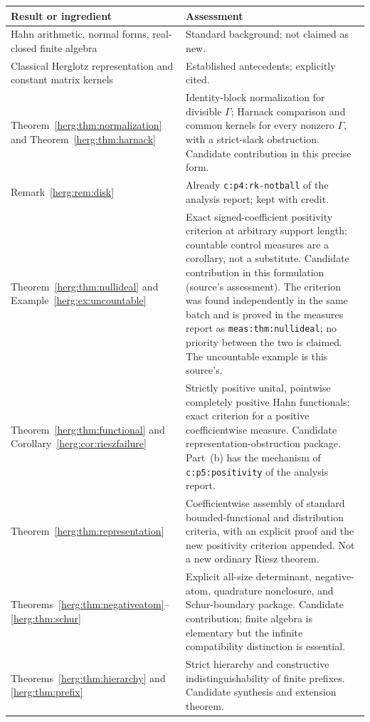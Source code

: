 \documentclass[11pt,letterpaper]{article}
\theoremstyle{definition}
\newcommand{\lbl}[1]{\nolinkurl{#1}}%
\numberwithin{equation}{section}
\begin{document}
\begin{longtable}{@{}p{}p{}@{}}
\toprule
Result or ingredient & Assessment\\
\midrule
\endhead
Hahn arithmetic, normal forms, real-closed finite algebra & Standard background; not claimed as new.\\[4pt]
Classical Herglotz representation and constant matrix kernels & Established antecedents; explicitly cited.\\[4pt]
Theorem~\ref{herg:thm:normalization} and Theorem~\ref{herg:thm:harnack} & Identity-block normalization for divisible $\Gamma$; Harnack comparison and common kernels for every nonzero $\Gamma$, with a strict-slack obstruction. Candidate contribution in this precise form.\\[4pt]
Remark~\ref{herg:rem:disk} & Already \lbl{c:p4:rk-notball} of the analysis report; kept with credit.\\[4pt]
Theorem~\ref{herg:thm:nullideal} and Example~\ref{herg:ex:uncountable} & Exact signed-coefficient positivity criterion at arbitrary support length; countable control measures are a corollary, not a substitute. Candidate contribution in this formulation (source's assessment). The criterion was found independently in the same batch and is proved in the measures report as \lbl{meas:thm:nullideal}; no priority between the two is claimed. The uncountable example is this source's.\\[4pt]
Theorem~\ref{herg:thm:functional} and Corollary~\ref{herg:cor:rieszfailure} & Strictly positive unital, pointwise completely positive Hahn functionals; exact criterion for a positive coefficientwise measure. Candidate representation-obstruction package. Part~(b) has the mechanism of \lbl{c:p5:positivity} of the analysis report.\\[4pt]
Theorem~\ref{herg:thm:representation} & Coefficientwise assembly of standard bounded-functional and distribution criteria, with an explicit proof and the new positivity criterion appended. Not a new ordinary Riesz theorem.\\[4pt]
Theorems~\ref{herg:thm:negativeatom}--\ref{herg:thm:schur} & Explicit all-size determinant, negative-atom, quadrature nonclosure, and Schur-boundary package. Candidate contribution; finite algebra is elementary but the infinite compatibility distinction is essential.\\[4pt]
Theorems~\ref{herg:thm:hierarchy} and \ref{herg:thm:prefix} & Strict hierarchy and constructive indistinguishability of finite prefixes. Candidate synthesis and extension theorem.\\
\bottomrule
\end{longtable}
\end{document}
